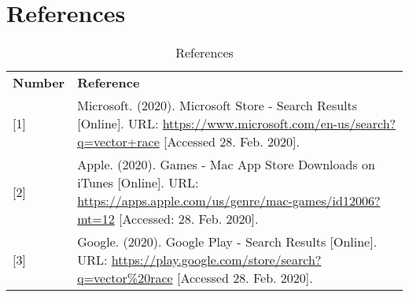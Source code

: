 \section{References}
	\begin{table}[ht]
		\begin{tabularx}{\textwidth}{l X}
			\hline
			\textbf{Number}		& \textbf{Reference} \\
			\textnormal{[1]}	& \textnormal{Microsoft. (2020). Microsoft Store - Search Results [Online]. URL: \url{https://www.microsoft.com/en-us/search?q=vector+race} [Accessed 28. Feb. 2020].} \\
			\textnormal{[2]}	& \textnormal{Apple. (2020). Games - Mac App Store Downloads on iTunes [Online]. URL: \url{https://apps.apple.com/us/genre/mac-games/id12006?mt=12} [Accessed: 28. Feb. 2020].} \\
			\textnormal{[3]}	& \textnormal{Google. (2020). Google Play - Search Results [Online]. URL: \url{https://play.google.com/store/search?q=vector\%20race} [Accessed 28. Feb. 2020].} \\
			\hline
		\end{tabularx}
		\caption{References}
	\end{table}